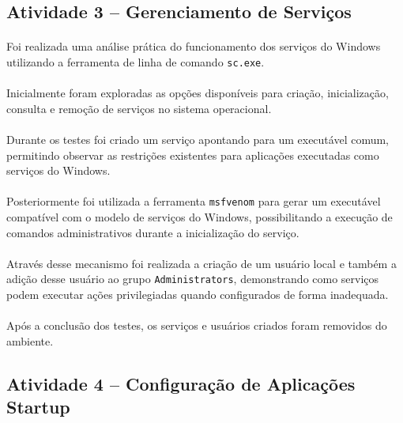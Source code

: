 \subsection{Atividade 3 -- Gerenciamento de Serviços}

\paragraph{}
Foi realizada uma análise prática do funcionamento dos serviços do Windows
utilizando a ferramenta de linha de comando \texttt{sc.exe}.

\paragraph{}
Inicialmente foram exploradas as opções disponíveis para criação,
inicialização, consulta e remoção de serviços no sistema operacional.

\paragraph{}
Durante os testes foi criado um serviço apontando para um executável comum,
permitindo observar as restrições existentes para aplicações executadas como
serviços do Windows.

\paragraph{}
Posteriormente foi utilizada a ferramenta \texttt{msfvenom} para gerar um
executável compatível com o modelo de serviços do Windows, possibilitando a
execução de comandos administrativos durante a inicialização do serviço.

\paragraph{}
Através desse mecanismo foi realizada a criação de um usuário local e também a
adição desse usuário ao grupo \texttt{Administrators}, demonstrando como
serviços podem executar ações privilegiadas quando configurados de forma
inadequada.

\paragraph{}
Após a conclusão dos testes, os serviços e usuários criados foram removidos do
ambiente.

\subsection{Atividade 4 -- Configuração de Aplicações Startup}

